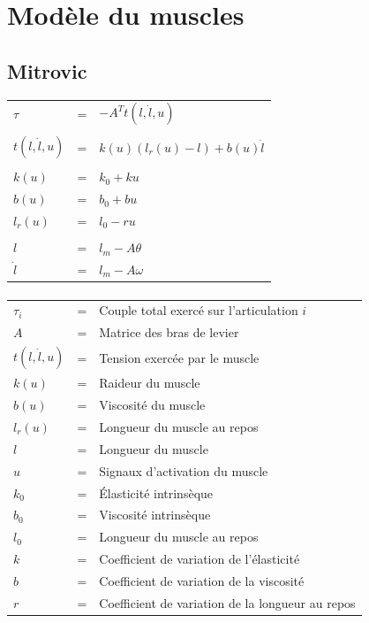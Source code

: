 \documentclass[pdftex,a4paper,11pt]{article}
\begin{document}
\section{Modèle du muscles}

\subsection{Mitrovic}

\begin{tabular}{lcl}
    $\tau$ & = & $-A^T t(l, \dot{l}, u)$ \\
    & & \\
    $t(l, \dot{l}, u)$        & = & $k(u) (l_r(u) - l) + b(u) \dot{l}$ \\
    & & \\
    $k(u)$    & = & $k_0 + k u$ \\
    $b(u)$    & = & $b_0 + b u$ \\
    $l_r(u)$  & = & $l_0 - r u$ \\
    & & \\
    $l$       & = & $l_m - A \theta $ \\
    $\dot{l}$ & = & $l_m - A \omega $ \\
\end{tabular}

\paragraph{}
\begin{tabular}{lcl}
    $\tau_i$ & = & Couple total exercé sur l'articulation $i$ \\
    $A$  & = & Matrice des bras de levier \\
    $t(l, \dot{l}, u)$  & = & Tension exercée par le muscle \\
    $k(u)$ & = & Raideur du muscle \\
    $b(u)$ & = & Viscosité du muscle \\
    $l_r(u)$ & = & Longueur du muscle au repos \\
    $l$ & = & Longueur du muscle \\
    $u$ & = & Signaux d'activation du muscle \\
    $k_0$ & = & Élasticité intrinsèque \\
    $b_0$ & = & Viscosité intrinsèque \\
    $l_0$ & = & Longueur du muscle au repos \\
    $k$ & = & Coefficient de variation de l'élasticité \\
    $b$ & = & Coefficient de variation de la viscosité \\
    $r$ & = & Coefficient de variation de la longueur au repos \\
\end{tabular}
\end{document}
